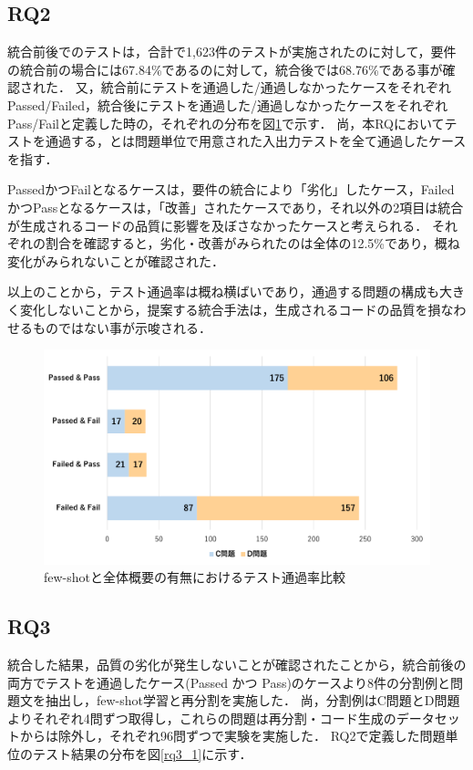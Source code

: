 \documentclass[submit,techrep,noauthor]{ipsj}
\begin{document}
\subsection{RQ2}
統合前後でのテストは，合計で1,623件のテストが実施されたのに対して，要件の統合前の場合には67.84\%であるのに対して，統合後では68.76\%である事が確認された．
又，統合前にテストを通過した/通過しなかったケースをそれぞれPassed/Failed，統合後にテストを通過した/通過しなかったケースをそれぞれPass/Failと定義した時の，それぞれの分布を図\ref{rq2_1}で示す．
尚，本RQにおいてテストを通過する，とは問題単位で用意された入出力テストを全て通過したケースを指す．

PassedかつFailとなるケースは，要件の統合により「劣化」したケース，FailedかつPassとなるケースは，「改善」されたケースであり，それ以外の2項目は統合が生成されるコードの品質に影響を及ぼさなかったケースと考えられる．
それぞれの割合を確認すると，劣化・改善がみられたのは全体の12.5\%であり，概ね変化がみられないことが確認された．

以上のことから，テスト通過率は概ね横ばいであり，通過する問題の構成も大きく変化しないことから，提案する統合手法は，生成されるコードの品質を損なわせるものではない事が示唆される．

\begin{figure}[t]
    \centering
    \includegraphics[width=1.0\linewidth]{./Toyoshima_fig/SIGSE_PF.pdf}
    \caption{few-shotと全体概要の有無におけるテスト通過率比較\protect\footnotemark}
    \label{rq2_1}
\end{figure}

\subsection{RQ3}
統合した結果，品質の劣化が発生しないことが確認されたことから，統合前後の両方でテストを通過したケース(Passed かつ Pass)のケースより8件の分割例と問題文を抽出し，few-shot学習と再分割を実施した．
尚，分割例はC問題とD問題よりそれぞれ4問ずつ取得し，これらの問題は再分割・コード生成のデータセットからは除外し，それぞれ96問ずつで実験を実施した．
RQ2で定義した問題単位のテスト結果の分布を図\ref{rq3_1}に示す．
\end{document}
